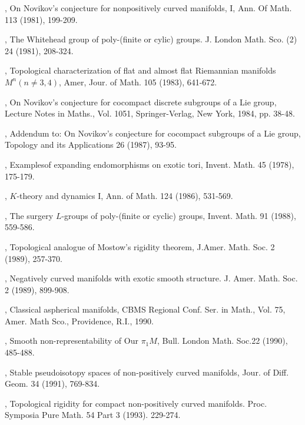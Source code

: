 \begin{thebibliography}{99}
, On Novikov's conjecture for
  nonpositively curved manifolds, I, Ann. Of Math. 113 (1981), 199-209.

, The Whitehead group of
  poly-(finite or cylic) groups. J. London Math. Sco. (2) 24 (1981), 208-324.

, Topological
  characterization of flat and almost flat Riemannian manifolds $M^n
  (n \neq 3, 4)$, Amer, Jour. of Math. 105 (1983), 641-672.

, On Novikov's conjecture
  for cocompact discrete subgroups of a Lie group, Lecture Notes in
  Maths., Vol. 1051, Springer-Verlag, New York, 1984, pp. 38-48.

, Addendum to: On Novikov's
  conjecture for cocompact subgroups of a Lie group, Topology and its
  Applications 26 (1987), 93-95.

, Examples\pageoriginale of expanding
  endomorphisms on exotic tori, Invent. Math. 45 (1978), 175-179.

, $K$-theory and dynamics I,
  Ann. of Math. 124 (1986), 531-569.

, The surgery $L$-groups of
  poly-(finite or cyclic) groups, Invent. Math. 91 (1988), 559-586.

, Topological analogue of
  Mostow's rigidity theorem, J.Amer. Math. Soc. 2 (1989), 257-370.

, Negatively curved manifolds
  with exotic smooth structure. J. Amer. Math. Soc. 2 (1989), 899-908.

, Classical aspherical
  manifolds, CBMS Regional Conf. Ser. in Math., Vol. 75, Amer. Math
  Sco., Providence, R.I., 1990.

, Smooth non-representability
  of Our $\pi_1 M$, Bull. London Math. Soc.22 (1990), 485-488. 

, Stable pseudoisotopy spaces
  of non-positively curved manifolds, Jour. of Diff. Geom. 34 (1991),
  769-834.

, Topological rigidity for
  compact non-positively curved manifolds. Proc. Symposia Pure
  Math. 54 Part 3 (1993). 229-274.


\end{thebibliography}

